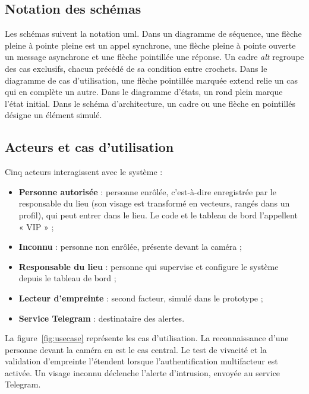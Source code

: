 \subsection{Notation des schémas}

Les schémas suivent la notation \gls{uml}. Dans un diagramme de séquence, une flèche pleine à pointe pleine est un appel synchrone, une flèche pleine à pointe ouverte un message asynchrone et une flèche pointillée une réponse. Un cadre \emph{alt} regroupe des cas exclusifs, chacun précédé de sa condition entre crochets. Dans le diagramme de cas d'utilisation, une flèche pointillée marquée \guillemotleft{} extend \guillemotright{} relie un cas qui en complète un autre. Dans le diagramme d'états, un rond plein marque l'état initial. Dans le schéma d'architecture, un cadre ou une flèche en pointillés désigne un élément simulé.

\subsection{Acteurs et cas d'utilisation}

Cinq acteurs interagissent avec le système :
\begin{itemize}
  \item \textbf{Personne autorisée} : personne enrôlée, c'est-à-dire enregistrée par le responsable du lieu (son visage est transformé en vecteurs, rangés dans un profil), qui peut entrer dans le lieu. Le code et le tableau de bord l'appellent « VIP » ;
  \item \textbf{Inconnu} : personne non enrôlée, présente devant la caméra ;
  \item \textbf{Responsable du lieu} : personne qui supervise et configure le système depuis le tableau de bord ;
  \item \textbf{Lecteur d'empreinte} : second facteur, simulé dans le prototype ;
  \item \textbf{Service Telegram} : destinataire des alertes.
\end{itemize}
La figure~\ref{fig:usecase} représente les cas d'utilisation. La reconnaissance d'une personne devant la caméra en est le cas central. Le test de vivacité et la validation d'empreinte l'étendent lorsque l'authentification multifacteur est activée. Un visage inconnu déclenche l'alerte d'intrusion, envoyée au service Telegram.

